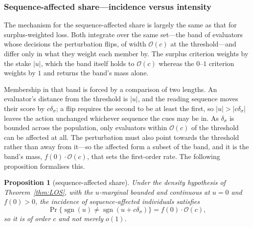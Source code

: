 \documentclass[a4paper,fleqn]{cas-sc}
\newtheorem{proposition}{Proposition}
\theoremstyle{remark}
\theoremstyle{definition}
\newcommand{\sgn}{\operatorname{sgn}}
\newcommand{\bigO}{\mathcal{O}}
\newcommand{\anchor}[1]{}
\begin{document}
\subsubsection{Sequence-affected share---incidence versus intensity}
\label{sec:criterion}

The mechanism for the sequence-affected share is largely the same as that for surplus-weighted loss. Both
integrate over the same set---the band of evaluators whose decisions the perturbation flips, of
width $\bigO(c)$ at the threshold---and differ only in what they weight each member by. The surplus criterion weights by the stake $|u|$, which the band itself holds to $\bigO(c)$ whereas the $0$--$1$ criterion weights by $1$ and returns the band's mass alone.

Membership in that band is forced by a comparison of two lengths. An evaluator's distance from
the threshold is $|u|$, and the reading sequence moves their score by $c\delta_\sigma$; a flip
requires the second to be at least the first, so $|u|>|c\delta_\sigma|$ leaves the action
unchanged whichever sequence the cues may be in. As $\delta_\sigma$ is bounded across the population,
only evaluators within $\bigO(c)$ of the threshold can be affected at all. The perturbation must also point towards the threshold rather
than away from it---so the affected form a subset of the band, and it is the band's mass,
$f(0)\cdot\bigO(c)$, that sets the first-order rate. The following proposition formalises this.

\renewcommand{\theproposition}{SHR}%
\begin{proposition}[sequence-affected share]\label{prop:SHR}
Under the density hypothesis of Theorem~\ref{thm:LOS}, with the $u$-marginal bounded and
continuous at $u=0$ and $f(0)>0$, the \emph{incidence} of sequence-affected individuals
satisfies
\[
  \Pr\{\sgn(u)\neq\sgn(u+c\delta_\sigma)\}=f(0)\cdot\bigO(c),
\]
so it is of order $c$ and not merely $o(1)$. \anchor{Prop.~SHR}
\end{proposition}
\end{document}
